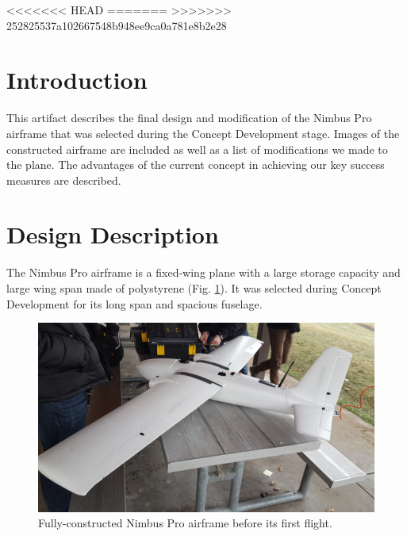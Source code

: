 \documentclass[]{auvsi_doc}
\begin{document}
\begin{AUVSITitlePage}
\begin{artifacttable}
<<<<<<< HEAD
=======
>>>>>>> 252825537a102667548b948ee9ca0a781e8b2e28
\end{artifacttable}
\end{AUVSITitlePage}

\section{Introduction}
This artifact describes the final design and modification of the Nimbus Pro airframe that was selected during the Concept Development stage. Images of the constructed airframe are included as well as a list of modifications we made to the plane. The advantages of the current concept in achieving our key success measures are described.

\section{Design Description}
The Nimbus Pro airframe is a fixed-wing plane with a large storage capacity and large wing span made of polystyrene (Fig. \ref{fig:plane1}). It was selected during Concept Development for its long span and spacious fuselage.

\begin{figure}[h!]
	\centering
	\includegraphics[width=.9\columnwidth]{figs/plane1}
	\caption{Fully-constructed Nimbus Pro airframe before its first flight.}
	\label{fig:plane1}
\end{figure} 
\end{document}
